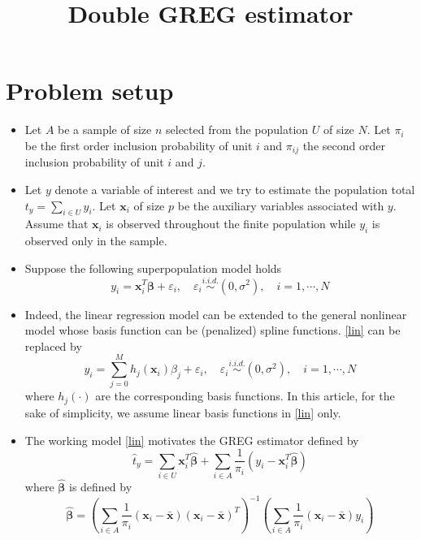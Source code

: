 \documentclass[12pt]{article}
\renewcommand{\bf}[1]{\boldsymbol{\mathbf{#1}}}
\newcommand{\pa}[1]{\left(#1\right)} %
\newcommand{\iid}{\stackrel{i.i.d.}{\sim}}
\begin{document}
\title{Double GREG estimator}

\maketitle

\section{Problem setup}
\begin{itemize}
    \item Let \(A\) be a sample of size \(n\) selected from the population
\(U\) of size \(N\). Let $\pi_i$ be the first order inclusion probability of unit $i$ and $\pi_{ij}$ the second order inclusion probability of unit $i$ and $j$.
\item Let \(y\) denote a variable of interest and we try to estimate the population total \(t_y = \sum_{i \in U} y_i\). Let \(\bf x_{i}\) of size \(p\) be the auxiliary variables associated with \(y\). 
Assume that $\bf x_i$ is observed throughout the finite population while $y_i$ is observed only in the sample.
\item Suppose the following superpopulation model holds
\begin{equation}
    y_i = \bf x_i^T \bf \beta + \varepsilon_i, \quad \varepsilon_i \iid (0,\sigma^2), \quad i = 1, \cdots, N \label{lin}
\end{equation}
\item Indeed, the linear regression model can be extended to the general nonlinear model whose basis function can be (penalized) spline functions. \eqref{lin} can be replaced by
\begin{equation}
    y_i = \sum_{j = 0}^Mh_j(\bf x_i) \beta_j + \varepsilon_i, \quad \varepsilon_i \iid (0,\sigma^2), \quad i = 1, \cdots, N 
\end{equation}
where $h_j(\cdot)$ are the corresponding basis functions. In this article, for the sake of simplicity, we assume linear basis functions in \eqref{lin} only.
\item The working model \eqref{lin} motivates the GREG estimator defined by
\begin{equation}
    \hat t_y = \sum_{i \in U}\bf x_i^T \hat {\bf \beta} + \sum_{i \in A}\frac{1}{\pi_i}\pa{y_i - \bf x_i^T \hat {\bf \beta}} \label{GREG}
\end{equation}
where $\hat {\bf \beta}$ is defined by
$$
\hat {\bf \beta} = \pa{\sum_{i \in A} \frac{1}{\pi_i}\pa{\bf x_i - \bar {\bf x}}\pa{\bf x_i - \bar {\bf x}}^T}^{-1}\pa{\sum_{i \in A} \frac{1}{\pi_i}\pa{\bf x_i - \bar {\bf x}}y_i}
$$
\end{itemize}
\end{document}

